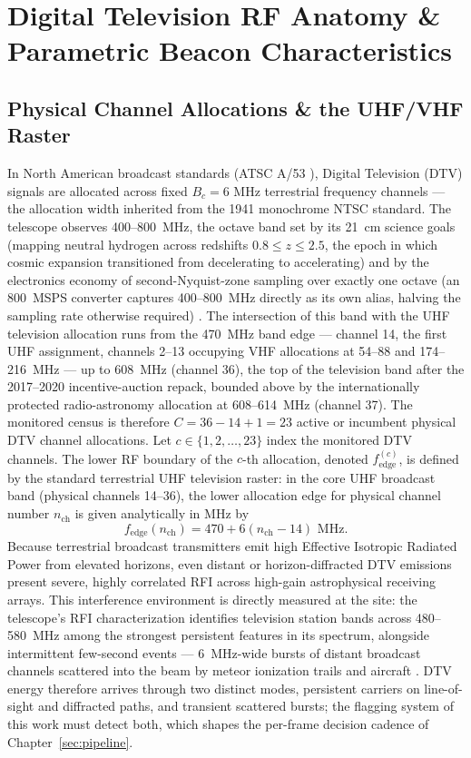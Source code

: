 
\chapter{Digital Television RF Anatomy \& Parametric Beacon Characteristics}
\label{sec:dtv}

\section{Physical Channel Allocations \& the UHF/VHF Raster}
\label{sec:dtv:raster}
In North American broadcast standards (ATSC A/53 \cite{atsc-a53}), Digital Television (DTV) signals are allocated across fixed $B_c = 6\text{ MHz}$ terrestrial frequency channels --- the allocation width inherited from the 1941 monochrome NTSC standard. The telescope observes 400--800~MHz, the octave band set by its 21~cm science goals (mapping neutral hydrogen across redshifts $0.8 \le z \le 2.5$, the epoch in which cosmic expansion transitioned from decelerating to accelerating) and by the electronics economy of second-Nyquist-zone sampling over exactly one octave (an 800~MSPS converter captures 400--800~MHz directly as its own alias, halving the sampling rate otherwise required) \cite{amiri2022chime}. The intersection of this band with the UHF television allocation runs from the 470~MHz band edge --- channel 14, the first UHF assignment, channels 2--13 occupying VHF allocations at 54--88 and 174--216~MHz --- up to 608~MHz (channel 36), the top of the television band after the 2017--2020 incentive-auction repack, bounded above by the internationally protected radio-astronomy allocation at 608--614~MHz (channel 37). The monitored census is therefore $C = 36 - 14 + 1 = 23$ active or incumbent physical DTV channel allocations. Let $c \in \{1, 2, \dots, 23\}$ index the monitored DTV channels. The lower RF boundary of the $c$-th allocation, denoted $f_{\text{edge}}^{(c)}$, is defined by the standard terrestrial UHF television raster: in the core UHF broadcast band (physical channels 14--36), the lower allocation edge for physical channel number $n_{\text{ch}}$ is given analytically in MHz by
\begin{equation}
f_{\text{edge}}(n_{\text{ch}}) = 470 + 6(n_{\text{ch}} - 14) \text{ MHz}.
\end{equation}
Because terrestrial broadcast transmitters emit high Effective Isotropic Radiated Power from elevated horizons, even distant or horizon-diffracted DTV emissions present severe, highly correlated RFI across high-gain astrophysical receiving arrays. This interference environment is directly measured at the site: the telescope's RFI characterization identifies television station bands across 480--580~MHz among the strongest persistent features in its spectrum, alongside intermittent few-second events --- 6~MHz-wide bursts of distant broadcast channels scattered into the beam by meteor ionization trails and aircraft \cite{amiri2022chime}. DTV energy therefore arrives through two distinct modes, persistent carriers on line-of-sight and diffracted paths, and transient scattered bursts; the flagging system of this work must detect both, which shapes the per-frame decision cadence of Chapter~\ref{sec:pipeline}.

